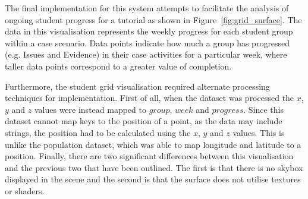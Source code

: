 {	

	The final implementation for this system attempts to facilitate the analysis of ongoing student progress for a tutorial as shown in Figure~\ref{fig:grid_surface}. The data in this visualisation represents the weekly progress for each student group within a case scenario. Data points indicate how much a group has progressed (e.g. Issues and Evidence) in their case activities for a particular week, where taller data points correspond to a greater value of completion.

	

	Furthermore, the student grid visualisation required alternate processing techniques for implementation. First of all, when the dataset was processed the $x$, $y$ and $z$ values were instead mapped to $group$, $week$ and $progress$. Since this dataset cannot map keys to the position of a point, as the data may include strings, the position had to be calculated using the $x$, $y$ and $z$ values. This is unlike the population dataset, which was able to map longitude and latitude to a position. Finally, there are two significant differences between this visualisation and the previous two that have been outlined. The first is that there is no skybox displayed in the scene and the second is that the surface does not utilise textures or shaders.
	
}

